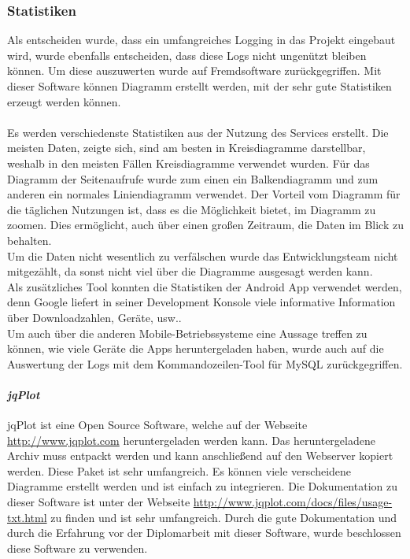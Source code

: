 \subsubsection{Statistiken}
%
Als entscheiden wurde, dass ein umfangreiches Logging in das Projekt eingebaut wird, wurde ebenfalls entscheiden, dass diese Logs nicht ungenützt bleiben können. Um diese auszuwerten wurde auf Fremdsoftware zurückgegriffen. Mit dieser Software können Diagramm erstellt werden, mit der sehr gute Statistiken erzeugt werden können.\\
\\
Es werden verschiedenste Statistiken aus der Nutzung des Services erstellt. Die meisten Daten, zeigte sich, sind am besten in Kreisdiagramme darstellbar, weshalb in den meisten Fällen Kreisdiagramme verwendet wurden. Für das Diagramm der Seitenaufrufe wurde zum einen ein Balkendiagramm und zum anderen ein normales Liniendiagramm verwendet. Der Vorteil vom Diagramm für die täglichen Nutzungen ist, dass es die Möglichkeit bietet, im Diagramm zu zoomen. Dies ermöglicht, auch über einen großen Zeitraum, die Daten im Blick zu behalten.\\
Um die Daten nicht wesentlich zu verfälschen wurde das Entwicklungsteam nicht mitgezählt, da sonst nicht viel über die Diagramme ausgesagt werden kann.\\
Als zusätzliches Tool konnten die Statistiken der Android App verwendet werden, denn Google liefert in seiner Development Konsole viele informative Information über Downloadzahlen, Geräte, usw..\\
Um auch über die anderen Mobile-Betriebssysteme eine Aussage treffen zu können, wie viele Geräte die Apps heruntergeladen haben, wurde auch auf die Auswertung der Logs mit dem Kommandozeilen-Tool für MySQL zurückgegriffen.
\paragraph{\textit{jqPlot}\\}
jqPlot ist eine Open Source Software, welche auf der Webseite \url{http://www.jqplot.com} heruntergeladen werden kann. Das heruntergeladene Archiv muss entpackt werden und kann anschließend auf den Webserver kopiert werden. Diese Paket ist sehr umfangreich. Es können viele verscheidene Diagramme erstellt werden und ist einfach zu integrieren. Die Dokumentation zu dieser Software ist unter der Webseite \url{http://www.jqplot.com/docs/files/usage-txt.html} zu finden und ist sehr umfangreich. Durch die gute Dokumentation und durch die Erfahrung vor der Diplomarbeit mit dieser Software, wurde beschlossen diese Software zu verwenden.
